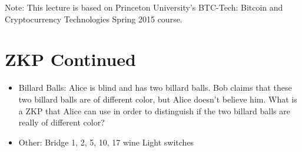 \documentclass{article}
\begin{document}
\maketitle

Note: This lecture is based on Princeton University's BTC-Tech: Bitcoin and Cryptocurrency Technologies Spring 2015 course.

\section*{ZKP Continued}
\begin{itemize}
  \item Billard Balls: Alice is blind and has two billard balls. Bob claims that these two billard balls are of different color, but Alice doesn't believe him.
    What is a ZKP that Alice can use in order to distinguish if the two billard balls are really of different color?
  \item Other:
    \subitem Bridge 1, 2, 5, 10, 17
     wine
    \subitem Light switches
\end{itemize}
\end{document}
